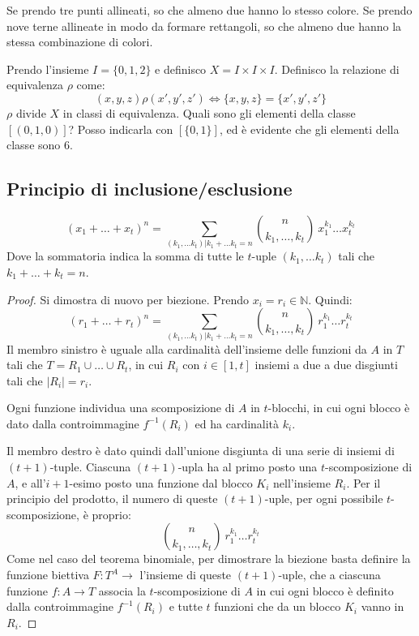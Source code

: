 Se prendo tre punti allineati, so che almeno due hanno lo stesso colore. Se prendo nove terne allineate in modo da formare rettangoli, so che almeno due hanno la stessa combinazione di colori.

Prendo l'insieme $I = \{ 0, 1, 2 \}$ e definisco $X = I \times I \times I$. Definisco la relazione di equivalenza $\rho$ come:
\[
(x, y, z) \rho (x', y', z') \Leftrightarrow \{ x, y, z \} = \{ x', y', z'\}
\]
$\rho$ divide $X$ in classi di equivalenza. Quali sono gli elementi della classe $[(0,1,0)]$? Posso indicarla con $[\{0,1\}]$, ed \`e evidente che gli elementi della classe sono 6.

\subsection{Principio di inclusione/esclusione}

\begin{prop}
\[
(x_1 + \dots + x_t)^n = \sum_{(k_1, \dots k_t) | k_1 + \dots k_t = n}
\binom{n}{k_1, \dots, k_t} \ x_1^{k_1} \dots x_t^{k_t}
\]
Dove la sommatoria indica la somma di tutte le $t$-uple $(k_1, \dots k_t)$ tali che $k_1 + \dots + k_t = n$.
\end{prop}
\begin{proof}
Si dimostra di nuovo per biezione. Prendo $x_i = r_i \in \mathbb{N}$. Quindi:
\[
(r_1 + \dots + r_t)^n = \sum_{(k_1, \dots k_t) | k_1 + \dots k_t = n}
\binom{n}{k_1, \dots, k_t} \ r_1^{k_1} \dots r_t^{k_t}
\]
Il membro sinistro \`e uguale alla cardinalit\`a dell'insieme delle funzioni da $A$ in $T$ tali che $T = R_1 \cup \dots \cup R_t$, in cui $R_i $ con $i \in [1, t]$ insiemi a due a due disgiunti tali che $| R_i | = r_i$.

Ogni funzione individua una scomposizione di $A$ in $t$-blocchi, in cui ogni blocco \`e dato dalla controimmagine $f^{-1} (R_i)$ ed ha cardinalit\`a $k_i$. 

Il membro destro \`e dato quindi dall'unione disgiunta di una serie di insiemi di $(t+1)$-tuple. Ciascuna $(t+1)$-upla ha al primo posto una $t$-scomposizione di $A$, e all'$i+1$-esimo posto una funzione dal blocco $K_i$ nell'insieme $R_i$. Per il principio del prodotto, il numero di queste $(t+1)$-uple, per ogni possibile $t$-scomposizione, \`e proprio:
\[
\binom{n}{k_1, \dots, k_t} \ r_1^{k_1} \dots r_t^{k_t}
\]
Come nel caso del teorema binomiale, per dimostrare la biezione basta definire la funzione biettiva $F : T^A \to$ l'insieme di queste $(t+1)$-uple, che a ciascuna funzione $f : A \to T$ associa la $t$-scomposizione di $A$ in cui ogni blocco \`e definito dalla controimmagine $f^{-1} (R_i)$ e tutte $t$ funzioni che da un blocco $K_i$ vanno in $R_i$.
\end{proof}
